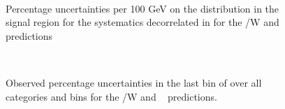 \begin{figure}[h!]
  \centering
  ~~
  \\
  \caption{\label{fig:uncPerHt} 
    Percentage uncertainties per 100 GeV on the \mht distribution in the signal region for the systematics decorrelated in \scalht
    for the \ttbar/W and \zInv~ predictions}
\end{figure}

\begin{figure}[h!]
  \centering
  ~~
  \\
  \caption{\label{fig:frenchFlagLastBin} Observed percentage uncertainties in the 
  last bin of \mht over all categories and \scalht bins for the \ttbar/W and \zInv~ predictions.}
\end{figure}


